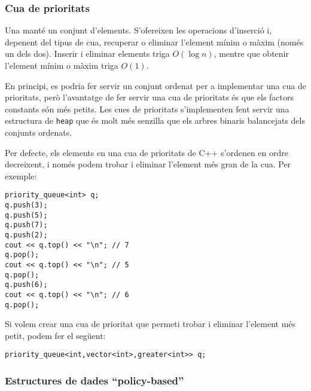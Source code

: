 \subsubsection{Cua de prioritats}


Una 
manté un conjunt d'elements.
S'ofereixen les operacions d'inserció i,
depenent del tipus de cua,
recuperar o eliminar
l'element mínim o màxim (només un dels dos).
Inserir i eliminar elements triga $O(\log n)$,
mentre que obtenir l'element mínim o màxim triga $O(1)$.

En principi, es podria fer servir un conjunt ordenat per
a implementar una cua de prioritats, però l'avantatge de fer
servir una cua de prioritats és que els factors constants són més
petits.
Les cues de prioritats s'implementen fent servir una estructura
de \texttt{heap} que és molt més senzilla que els arbres binaris
balancejats dels conjunts ordenats.

Per defecte, els elements en una cua de prioritats
de C++ s'ordenen en ordre decreixent,
i només podem trobar i eliminar l'element més gran de la cua.
Per exemple:

\begin{lstlisting}
priority_queue<int> q;
q.push(3);
q.push(5);
q.push(7);
q.push(2);
cout << q.top() << "\n"; // 7
q.pop();
cout << q.top() << "\n"; // 5
q.pop();
q.push(6);
cout << q.top() << "\n"; // 6
q.pop();
\end{lstlisting}

Si volem crear una cua de prioritat
que permeti trobar i eliminar
l'element més petit,
podem fer el següent:

\begin{lstlisting}
priority_queue<int,vector<int>,greater<int>> q;
\end{lstlisting}

\subsubsection{Estructures de dades ``policy-based''}

